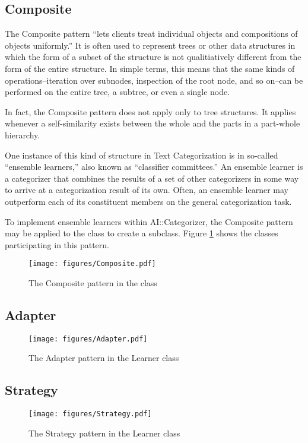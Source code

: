 \documentclass[a4paper]{report}
\begin{document}
\subsection{Composite}

The Composite pattern ``lets clients treat individual objects and
compositions of objects uniformly.'' \cite[p. 163]{gamma:95} It is
often used to represent trees or other data structures in which the
form of a subset of the structure is not qualitiatively different from
the form of the entire structure.  In simple terms, this means that
the same kinds of operations--iteration over subnodes, inspection of
the root node, and so on--can be performed on the entire tree, a
subtree, or even a single node.

In fact, the Composite pattern does not apply only to tree
structures.  It applies whenever a self-similarity exists between the
whole and the parts in a part-whole hierarchy.

One instance of this kind of structure in Text Categorization is in
so-called ``ensemble learners,'' also known as ``classifier
committees.''  An ensemble learner is a categorizer that combines the
results of a set of other categorizers in some way to arrive at a
categorization result of its own. \cite[p. 30]{sebastiani:02} Often,
an ensemble learner may outperform each of its constituent members on
the general categorization task.  \cite{tumer:98}

To implement ensemble learners within AI::Categorizer, the Composite
pattern may be applied to the  class to create a
 subclass.  Figure \ref{Composite-ensemble}
shows the classes participating in this pattern.

\begin{figure}
\texttt{[image: figures/Composite.pdf]}
\caption{The Composite pattern in the  class}
\label{Composite-ensemble}
\end{figure}




\subsection{Adapter}
\begin{figure}
\texttt{[image: figures/Adapter.pdf]}
\caption{The Adapter pattern in the Learner class}
\label{Adapter-learner}
\end{figure}

\subsection{Strategy}
\begin{figure}
\texttt{[image: figures/Strategy.pdf]}
\caption{The Strategy pattern in the Learner class}
\label{Strategy-learner}
\end{figure}
\end{document}
